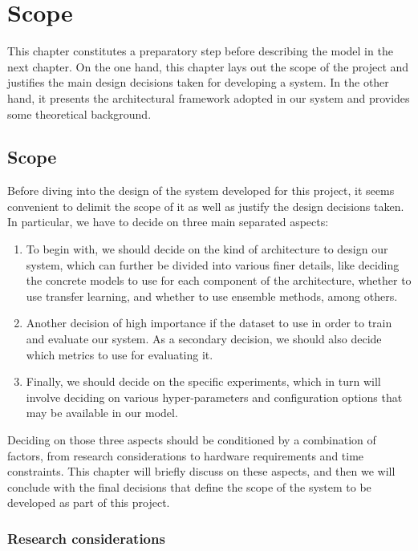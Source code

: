 \chapter{Scope}
\label{ch:design}

This chapter constitutes a preparatory step before describing the model in the next chapter. On the one hand, this chapter lays out the scope of the project and justifies the main design decisions taken for developing a system. In the other hand, it presents the architectural framework adopted in our system and provides some  theoretical background.

\section{Scope}\label{sec:scope}

Before diving into the design of the system developed for this project, it seems convenient to delimit the scope of it as well as justify the design decisions taken. In particular, we have to decide on three main separated aspects:

\begin{enumerate}
\item To begin with, we should decide on the kind of architecture to design our system, which can further be divided into various finer details, like deciding the concrete models to use for each component of the architecture, whether to use transfer learning, and whether to use ensemble methods, among others.
\item Another decision of high importance if the dataset to use in order to train and evaluate our system. As a secondary decision, we should also decide which metrics to use for evaluating it.
\item Finally, we should decide on the specific experiments, which in turn will involve deciding on various hyper-parameters and configuration options that may be available in our model.
\end{enumerate}

Deciding on those three aspects should be conditioned by a combination of factors, from research considerations to hardware requirements and time constraints. This chapter will briefly discuss on these aspects, and then we will conclude with the final decisions that define the scope of the system to be developed as part of this project.

\subsection{Research considerations}

